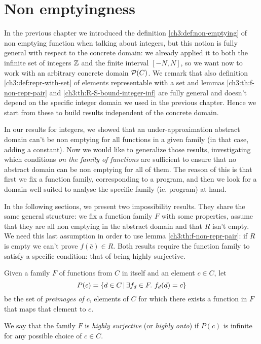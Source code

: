 \section{Non emptyingness}
In the previous chapter we introduced the definition \ref{ch3:def:non-emptying} of non emptying function when talking about integers, but this notion is fully general with respect to the concrete domain: we already applied it to both the infinite set of integers $\mathbb{Z}$ and the finite interval $[-N, N]$, so we want now to work with an arbitrary concrete domain $\mathcal{P}(C)$.
We remark that also definition \ref{ch3:def:repr-with-set} of elements representable with a set and lemmas \ref{ch3:th:f-non-repr-pair} and \ref{ch3:th:R-S-bound-integer-inf} are fully general and doesn't depend on the specific integer domain we used in the previous chapter. Hence we start from these to build results independent of the concrete domain.

In our results for integers, we showed that an under-approximation abstract domain can't be non emptying for all functions in a given family (in that case, adding a constant). Now we would like to generalize those results, investigating which conditions \textit{on the family of functions} are sufficient to ensure that no abstract domain can be non emptying for all of them. The reason of this is that first we fix a function family, corresponding to a program, and then we look for a domain well suited to analyse the specific family (ie. program) at hand.

In the following sections, we present two impossibility results. They share the same general structure: we fix a function family $F$ with some properties, assume that they are all non emptying in the abstract domain and that $R$ isn't empty. We need this last assumption in order to use lemma \ref{ch3:th:f-non-repr-pair}: if $R$ is empty we can't prove $f(\bar{c}) \in R$.
Both results require the function family to satisfy a specific condition: that of being highly surjective.

\begin{definition}\label{ch4:def:highly-onto-func-family}
	Given a family $F$ of functions from $C$ in itself and an element $c \in C$, let
	\[
	P(c) = \{ d \in C \,\vert\, \exists f_d \in F .\ f_d(d) = c \}
	\]
	be the set of \textit{preimages of $c$}, elements of $C$ for which there exists a function in $F$ that maps that element to $c$.

	We say that the family $F$ is \textit{highly surjective} (or \textit{highly onto}) if $P(c)$ is infinite for any possible choice of $c \in C$.
\end{definition}

